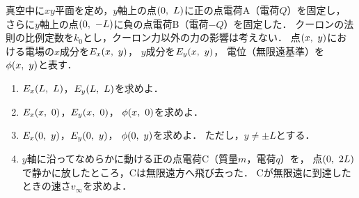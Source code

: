 \documentclass[../../../ps_q.tex]{subfiles}
\begin{document}
    真空中に$xy$平面を定め，$y$軸上の点$(0,\hspace{3.4pt} L)$に正の点電荷A（電荷$Q$）を固定し，%
    さらに$y$軸上の点$(0,\hspace{3.4pt} -L)$に負の点電荷B（電荷$-Q$）を固定した．%
    クーロンの法則の比例定数を$k_0$とし，クーロン力以外の力の影響は考えない．%
    点$(x,\hspace{3.4pt} y)$における電場の$x$成分を$E_x(x,\hspace{3.4pt} y)$，%
    $y$成分を$E_y(x,\hspace{3.4pt} y)$，%
    電位（無限遠基準）を$\phi(x,\hspace{3.4pt} y)$と表す．

    \begin{enumerate}
        \item $E_x(L,\hspace{3.4pt} L)$，$E_y(L,\hspace{3.4pt} L)$を求めよ．
        \item $E_x(x,\hspace{3.4pt} 0)$，$E_y(x,\hspace{3.4pt} 0)$，%
            $\phi(x,\hspace{3.4pt} 0)$を求めよ．
        \item $E_x(0,\hspace{3.4pt} y)$，$E_y(0,\hspace{3.4pt} y)$，%
            $\phi(0,\hspace{3.4pt} y)$を求めよ．%
            ただし，$y \neq \pm L$とする．
        \item $y$軸に沿ってなめらかに動ける正の点電荷C（質量$m$，電荷$q$）を，%
            点$(0,\hspace{3.4pt} 2L)$で静かに放したところ，Cは無限遠方へ飛び去った．%
            Cが無限遠に到達したときの速さ$v_\infty$を求めよ．
    \end{enumerate}
\end{document}
